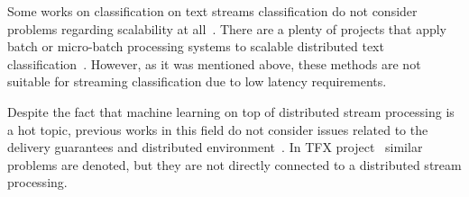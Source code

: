 \label{fs-related}

Some works on classification on text streams classification do not consider problems regarding scalability at all~\cite{zhang2008one}. There are a plenty of projects that apply batch or micro-batch processing systems to scalable distributed text classification~\cite{semberecki2016distributed, 8029336, Nodarakis2016LargeSS, baltas2016apache, svyatkovskiy2016large, berral2015aloja}. However, as it was mentioned above, these methods are not suitable for streaming classification due to low latency requirements. 

Despite the fact that machine learning on top of distributed stream processing is a hot topic, previous works in this field do not consider issues related to the delivery guarantees and distributed environment~\cite{khumoyun2016real, morales2015samoa}. In TFX project~\cite{Baylor:2017:TTP:3097983.3098021} similar problems are denoted, but they are not directly connected to a distributed stream processing. 